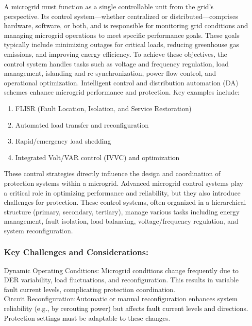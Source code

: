 A microgrid must function as a single controllable unit from the grid's perspective. Its control system—whether centralized or distributed—comprises hardware, software, or both, and is responsible for monitoring grid conditions and managing microgrid operations to meet specific performance goals. These goals typically include minimizing outages for critical loads, reducing greenhouse gas emissions, and improving energy efficiency.
To achieve these objectives, the control system handles tasks such as voltage and frequency regulation, load management, islanding and re-synchronization, power flow control, and operational optimization. Intelligent control and distribution automation (DA) schemes enhance microgrid performance and protection. Key examples include:

\begin{enumerate}
\item FLISR (Fault Location, Isolation, and Service Restoration)
\item Automated load transfer and reconfiguration
\item Rapid/emergency load shedding
\item Integrated Volt/VAR control (IVVC) and optimization
\end{enumerate}

These control strategies directly influence the design and coordination of protection systems within a microgrid. Advanced microgrid control systems play a critical role in optimizing performance and reliability, but they also introduce challenges for protection. These control systems, often organized in a hierarchical structure (primary, secondary, tertiary), manage various tasks including energy management, fault isolation, load balancing, voltage/frequency regulation, and system reconfiguration.
\subsubsection{Key Challenges and Considerations:}
Dynamic Operating Conditions: Microgrid conditions change frequently due to DER variability, load fluctuations, and reconfiguration. This results in variable fault current levels, complicating protection coordination.\\

Circuit Reconfiguration:Automatic or manual reconfiguration enhances system reliability (e.g., by rerouting power) but affects fault current levels and directions. Protection settings must be adaptable to these changes.\\

